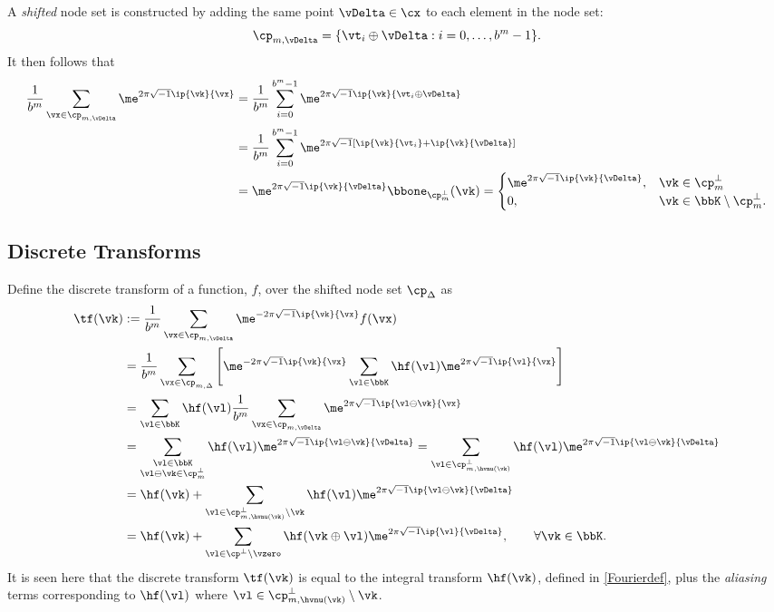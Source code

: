 \documentclass[]{elsarticle}
\theoremstyle{definition}
\begin{document}
A \emph{shifted} node set is constructed by adding the same point $\vDelta \in \cx$ to each element in the node set: 
\begin{equation*}
\cp_{m,\vDelta} = \{ \vt_i \oplus \vDelta : i=0, \ldots, b^m -1\}.
\end{equation*}
It then follows that 
\begin{align*}
\frac{1}{b^m} \sum_{\vx \in \cp_{m,\vDelta}} \me^{2 \pi \sqrt{-1} \ip{\vk}{\vx}}
& = \frac{1}{b^m} \sum_{i=0}^{b^m-1} \me^{2 \pi \sqrt{-1} \ip{\vk}{\vt_i \oplus \vDelta}}\\
& = \frac{1}{b^m} \sum_{i=0}^{b^m-1} \me^{2 \pi \sqrt{-1} [\ip{\vk}{\vt_i} + \ip{\vk} {\vDelta}]}\\
&= \me^{2 \pi \sqrt{-1} \ip{\vk}{\vDelta}} \bbone_{\cp_m^{\perp}}(\vk) = \begin{cases} \me^{2 \pi \sqrt{-1} \ip{\vk}{\vDelta}} , & \vk \in \cp_m^{\perp}\\
 0,  & \vk \in \bbK \setminus \cp_m^{\perp}.
 \end{cases}
\end{align*}

\subsection{Discrete Transforms}
Define the discrete transform of a function, $f$, over the shifted node set $\cp_{\Delta}$ as 
\begin{align}
\label{tfdef}
\tf(\vk) 
&:= \frac{1}{b^m} \sum_{\vx \in \cp_{m,\vDelta}} \me^{-2 \pi \sqrt{-1} \ip{\vk}{\vx}} f(\vx) \\
\nonumber
&= \frac{1}{b^m}  \sum_{\vx \in \cp_{m,\Delta}} \left[\me^{-2 \pi \sqrt{-1} \ip{\vk}{\vx}}\sum_{\vl \in \bbK} \hf(\vl) \me^{2 \pi \sqrt{-1} \ip{\vl}{\vx}} \right] \\
\nonumber
& = \sum_{\vl \in \bbK} \hf(\vl)  \frac{1}{b^m}  \sum_{\vx \in \cp_{m,\vDelta}}  \me^{2 \pi \sqrt{-1} \ip{\vl \ominus \vk}{\vx}} \\
\nonumber
& = \sum_{\substack{\vl \in \bbK \\ \vl \ominus \vk \in \cp_m^{\perp}}} \hf(\vl) \me^{2 \pi \sqrt{-1} \ip{\vl \ominus \vk}{\vDelta}}= \sum_{\vl \in \cp_{m,\hvnu(\vk)}^{\perp}} \hf(\vl) \me^{2 \pi \sqrt{-1} \ip{\vl \ominus \vk}{\vDelta}} \\
\nonumber
&= \hf(\vk) + \sum_{\vl \in \cp_{m,\hvnu(\vk)}^{\perp}\setminus\vk} \hf(\vl) \me^{2 \pi \sqrt{-1} \ip{\vl \ominus \vk}{\vDelta}}\\
&= \hf(\vk) + \sum_{\vl \in \cp^{\perp}\setminus \vzero} \hf(\vk\oplus\vl) \me^{2 \pi \sqrt{-1} \ip{\vl}{\vDelta}}, \qquad \forall \vk \in \bbK. \label{tfassum}
\end{align}
It is seen here that the discrete transform $\tf(\vk)$ is equal to the integral transform $\hf(\vk)$, defined in \eqref{Fourierdef}, plus the \emph{aliasing} terms corresponding to $\hf(\vl)$ where $\vl \in \cp_{m,\hvnu(\vk)}^{\perp}\setminus \vk$.
\end{document}
